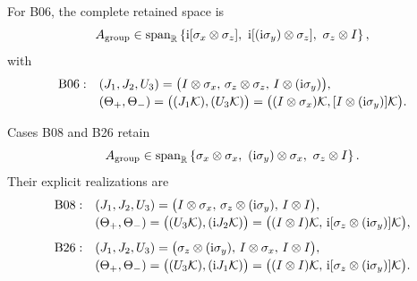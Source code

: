 For B06, the complete retained space is
\begin{equation*}
 A_{\rm group}\in\operatorname{span}_{\mathbb R}
 \left\{
 \ii[\sigma_x\otimes\sigma_z],\ 
 \ii[(\ii\sigma_y)\otimes\sigma_z],\ 
 \sigma_z\otimes I
 \right\},
\end{equation*}
with
\begin{align*}
\mathrm{B06}:\quad
 &(J_1,J_2,U_3)=
 \bigl(I\otimes\sigma_x,\,\sigma_z\otimes\sigma_z,\,
 I\otimes(\mathrm{i}\sigma_y)\bigr),\\[-2pt]
 &(\Theta_+,\Theta_-)=
 \bigl((J_1\mathcal{K}),(U_3\mathcal{K})\bigr)
 =\bigl((I\otimes\sigma_x)\mathcal{K},
 [I\otimes(\mathrm{i}\sigma_y)]\mathcal{K}\bigr).
\end{align*}

Cases B08 and B26 retain
\begin{equation*}
 A_{\rm group}\in\operatorname{span}_{\mathbb R}
 \left\{
 \sigma_x\otimes\sigma_x,\ 
 (\ii\sigma_y)\otimes\sigma_x,\ 
 \sigma_z\otimes I
 \right\}.
\end{equation*}
Their explicit realizations are
\begin{align*}
\mathrm{B08}:\quad
 &(J_1,J_2,U_3)=
 \bigl(I\otimes\sigma_x,\,
 \sigma_z\otimes(\mathrm{i}\sigma_y),\,I\otimes I\bigr),\\[-2pt]
 &(\Theta_+,\Theta_-)=
 \bigl((U_3\mathcal{K}),(\mathrm{i} J_2\mathcal{K})\bigr)
 =\bigl((I\otimes I)\mathcal{K},\,
 \mathrm{i}[\sigma_z\otimes(\mathrm{i}\sigma_y)]\mathcal{K}\bigr),\\[4pt]
\mathrm{B26}:\quad
 &(J_1,J_2,U_3)=
 \bigl(\sigma_z\otimes(\mathrm{i}\sigma_y),\,
 I\otimes\sigma_x,\,I\otimes I\bigr),\\[-2pt]
 &(\Theta_+,\Theta_-)=
 \bigl((U_3\mathcal{K}),(\mathrm{i} J_1\mathcal{K})\bigr)
 =\bigl((I\otimes I)\mathcal{K},\,
 \mathrm{i}[\sigma_z\otimes(\mathrm{i}\sigma_y)]\mathcal{K}\bigr).
\end{align*}

